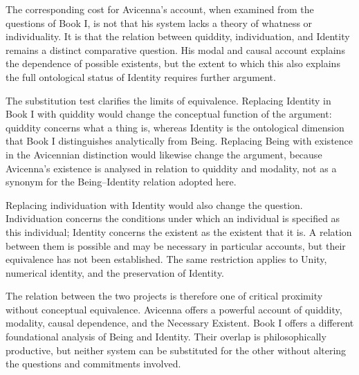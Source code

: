 The corresponding
cost for
Avicenna's account,
when examined
from the
questions of
Book I,
is not
that his
system lacks
a theory
of whatness
or individuality.
It is
that the
relation between
quiddity,
individuation,
and Identity
remains a
distinct comparative
question. His
modal and
causal account
explains the
dependence of
possible existents,
but the
extent to
which this
also explains
the full
ontological status
of Identity
requires further
argument.

\label{para:VS.B01.P01.C08.S13.SS17.P003}

The substitution
test clarifies
the limits
of equivalence.
Replacing Identity
in Book I
with quiddity
would change
the conceptual
function of
the argument:
quiddity concerns
what a
thing is,
whereas Identity
is the
ontological dimension
that Book I
distinguishes analytically
from Being.
Replacing Being
with existence
in the
Avicennian distinction
would likewise
change the
argument, because
Avicenna's existence
is analysed
in relation
to quiddity
and modality,
not as
a synonym
for the
Being--Identity
relation adopted
here.

\label{para:VS.B01.P01.C08.S13.SS17.P004}

Replacing individuation
with Identity
would also
change the
question. Individuation
concerns the
conditions under
which an
individual is
specified as
this individual;
Identity concerns
the existent
as the
existent that
it is. A
relation between
them is
possible and
may be
necessary in
particular accounts,
but their
equivalence has
not been
established. The
same restriction
applies to
Unity, numerical
identity, and
the preservation
of Identity.

\label{para:VS.B01.P01.C08.S13.SS17.P005}

The relation
between the
two projects
is therefore
one of
critical proximity
without conceptual
equivalence. Avicenna
offers a
powerful account
of quiddity,
modality, causal
dependence, and
the Necessary
Existent. Book I
offers a
different foundational
analysis of
Being and
Identity. Their
overlap is
philosophically productive,
but neither
system can
be substituted
for the
other without
altering the
questions and
commitments involved.



